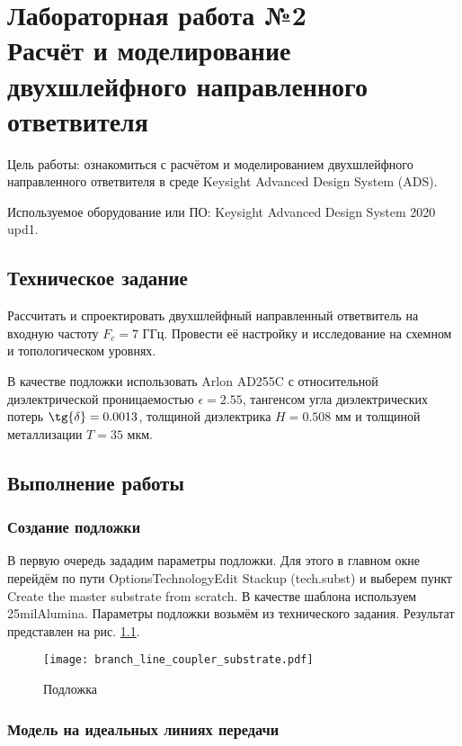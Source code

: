 \chapter{Лабораторная работа №2 \\
Расчёт и моделирование двухшлейфного направленного ответвителя}

Цель работы: ознакомиться с расчётом и моделированием двухшлейфного направленного ответвителя в среде Keysight Advanced Design System (ADS).

Используемое оборудование или ПО: Keysight Advanced Design System 2020 upd1.

\section{Техническое задание}

Рассчитать и спроектировать двухшлейфный направленный ответвитель на входную частоту $F_c = 7 \text{~ГГц}$.
Провести её настройку и исследование на схемном и топологическом уровнях.

В качестве подложки использовать Arlon AD255C с относительной диэлектрической проницаемостью $\epsilon = 2.55$, тангенсом угла диэлектрических потерь $\tg{\delta} = 0.0013$, толщиной диэлектрика $H = 0.508 \text{~мм}$ и толщиной металлизации $T = 35 \text{~мкм}$.

\section{Выполнение работы}

\subsection{Создание подложки}

В первую очередь зададим параметры подложки. Для этого в главном окне перейдём по пути Options\textrightarrow Technology\textrightarrow Edit Stackup (tech.subst) и выберем пункт Create the master substrate from scratch.
В качестве шаблона используем 25milAlumina.
Параметры подложки возьмём из технического задания.
Результат представлен на рис. \ref{fig:branch_line_coupler_substrate}.

\begin{figure}
    \centering
    \texttt{[image: branch\_line\_coupler\_substrate.pdf]}
    \caption{Подложка}
    \label{fig:branch_line_coupler_substrate}
\end{figure}

\subsection{Модель на идеальных линиях передачи}

